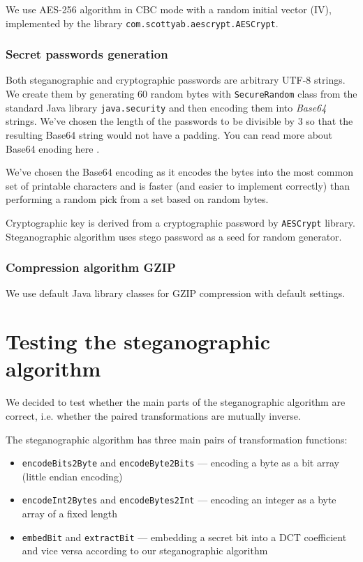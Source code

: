 We use AES-256 algorithm in CBC mode with a random initial vector (IV), implemented by 
the library \texttt{com.scottyab.aescrypt.AESCrypt}.

\subsubsection{Secret passwords generation}
Both steganographic and cryptographic passwords are arbitrary UTF-8 strings. We create 
them by generating 60 random bytes with \texttt{SecureRandom} class from the standard
Java library \texttt{java.security} and then encoding them into \emph{Base64} strings.
We've chosen the length of the passwords to be divisible by $3$ so that the resulting
Base64 string would not have a padding. 
You can read more about Base64 enoding here \cite{josefsson2006base16}.

We've chosen the Base64 encoding as it encodes the bytes into the most common set
of printable characters and is faster (and easier to implement correctly) 
than performing a random pick from a set based on random bytes.

Cryptographic key is derived from a cryptographic password by \texttt{AESCrypt}
library. Steganographic algorithm uses stego password as a seed for random generator.

\subsubsection{Compression algorithm GZIP}

We use default Java library classes for GZIP compression with default settings.

\section{Testing the steganographic algorithm}

We decided to test whether the main parts of the steganographic algorithm
are correct, i.e. whether the paired transformations are mutually inverse.

The steganographic algorithm has three main pairs of transformation functions:
\begin{itemize}
    \item \texttt{encodeBits2Byte} and \texttt{encodeByte2Bits} 
        --- encoding a byte as a bit array (little endian encoding)
    \item \texttt{encodeInt2Bytes} and \texttt{encodeBytes2Int}
        --- encoding an integer as a byte array of a fixed length
    \item \texttt{embedBit} and \texttt{extractBit} 
        --- embedding a secret bit into a DCT coefficient and vice versa
        according to our steganographic algorithm
\end{itemize}

